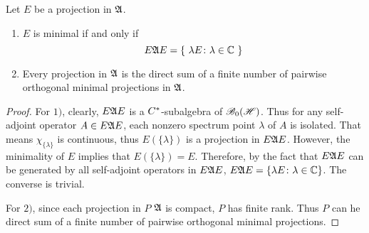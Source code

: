 \begin{prop}
	Let $E$ be a projection in $\mathfrak{A}$.
	\begin{enumerate}[label=\arabic*)]
		\item $E$ is minimal if and only if
		\begin{equation*}
			E\mathfrak{A} E = \{~\lambda E \colon \lambda \in \mathbb{C}~\}
		\end{equation*}
		\item Every projection in $\mathfrak{A}$ is the direct sum of a finite number of pairwise orthogonal minimal projections in $\mathfrak{A}$.
	\end{enumerate}
\end{prop}
\begin{proof}
	For $1)$, clearly, $E \mathfrak{A} E$ is a $C^{*}$-subalgebra of $\mathscr{B}_{0}\mathscr{(H)}$. Thus for any self-adjoint operator $A \in E \mathfrak{A} E$, each nonzero spectrum point $\lambda$ of $A$ is isolated. That means $\chi_{\{\lambda\}}$ is continuous, thus $E(\{\lambda\})$ is a projection in $E \mathfrak{A} E$. However, the minimality of $E$ implies that $E(\{\lambda\}) = E$. Therefore, by the fact that $E \mathfrak{A} E$ can be generated by all self-adjoint operators in $E \mathfrak{A} E$, $E\mathfrak{A} E = \{\lambda E \colon \lambda \in \mathbb{C}\}$. The converse is trivial.
	\item For $2)$, since each projection in $P$ $\mathfrak{A}$ is compact, $P$ has finite rank. Thus $P$ can he direct sum of a finite number of pairwise orthogonal minimal projections.
\end{proof}

